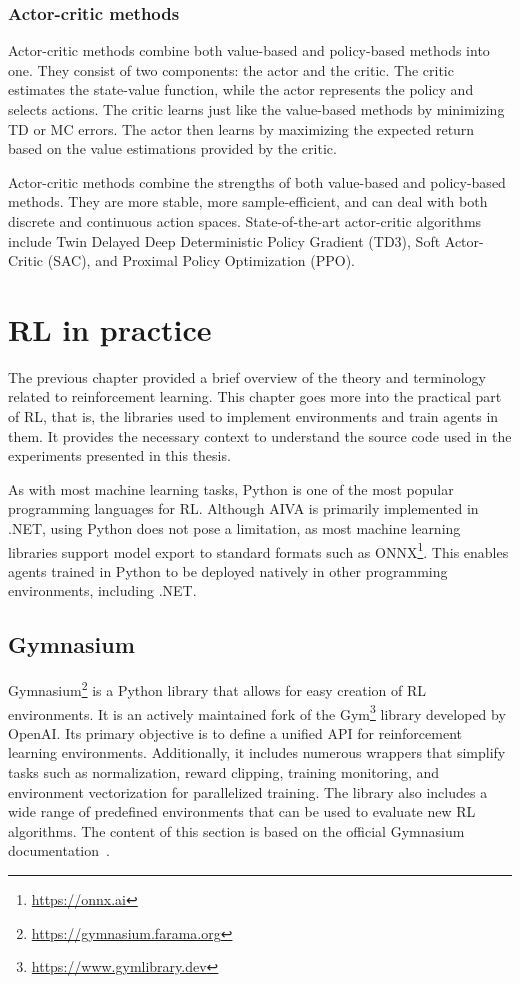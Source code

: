 \documentclass[
  digital,     %
  oneside,     %
  nosansbold,  %
  nocolorbold, %
  lof,         %
  lot,         %
]{fithesis4}
\begin{document}
\subsection{Actor-critic methods}

Actor-critic methods combine both value-based and policy-based methods into one. They consist of two components: the actor and the critic. The critic estimates the state-value function, while the actor represents the policy and selects actions. The critic learns just like the value-based methods by minimizing TD or MC errors. The actor then learns by maximizing the expected return based on the value estimations provided by the critic.

Actor-critic methods combine the strengths of both value-based and policy-based methods. They are more stable, more sample-efficient, and can deal with both discrete and continuous action spaces. State-of-the-art actor-critic algorithms include Twin Delayed Deep Deterministic Policy Gradient (TD3), Soft Actor-Critic (SAC), and Proximal Policy Optimization (PPO).

\chapter{RL in practice}

The previous chapter provided a brief overview of the theory and terminology related to reinforcement learning. This chapter goes more into the practical part of RL, that is, the libraries used to implement environments and train agents in them. It provides the necessary context to understand the source code used in the experiments presented in this thesis.

As with most machine learning tasks, Python is one of the most popular programming languages for RL. Although AIVA is primarily implemented in .NET, using Python does not pose a limitation, as most machine learning libraries support model export to standard formats such as ONNX\footnote{\url{https://onnx.ai}}. This enables agents trained in Python to be deployed natively in other programming environments, including .NET.

\section{Gymnasium}
\label{sec:gym}
Gymnasium\footnote{\url{https://gymnasium.farama.org}} is a Python library that allows for easy creation of RL environments. It is an actively maintained fork of the Gym\footnote{\url{https://www.gymlibrary.dev}} library developed by OpenAI. Its primary objective is to define a unified API for reinforcement learning environments. Additionally, it includes numerous wrappers that simplify tasks such as normalization, reward clipping, training monitoring, and environment vectorization for parallelized training. The library also includes a wide range of predefined environments that can be used to evaluate new RL algorithms. The content of this section is based on the official Gymnasium documentation~\cite{gym-docs}.
\end{document}
